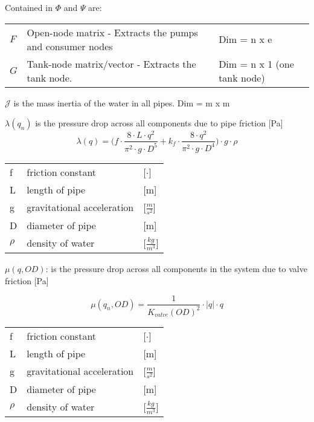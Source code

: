 Contained in $\Phi$ and $\Psi$ are:
\begin{center}
	\begin{tabular}{l p{10cm} l}
		$F$ & Open-node matrix - Extracts the pumps and consumer nodes & Dim = n x e \\
		$G$ & Tank-node matrix/vector - Extracts the tank node. & Dim = n x 1 (one tank node) 
	\end{tabular}
\end{center}

$ \mathcal{J}$ is the mass inertia of the water in all pipes. Dim =  m x m

$\lambda (q_n)$ is the pressure drop across all components due to pipe friction [\si{Pa}]
\begin{equation}
	\lambda(q)  =	\Big(f \cdot \frac{8\cdot L\cdot q^{2}}{\pi^{2}\cdot g \cdot D^{5}} + k_{f}\cdot \frac{8\cdot q^{2}}{\pi^{2}\cdot g \cdot D^{4}}\Big)\cdot g \cdot \rho
\end{equation}


\begin{center}
	\begin{tabular}{l p{10cm} l} 
		f & friction constant &	[$ \cdot $]		\\
		L & length of pipe &	[m]		\\
		g & gravitational acceleration & [$ \frac{m}{s^2} $]\\
		D & diameter of pipe & [m]			\\
		$ \rho $ & density of water & [$ \frac{kg}{m^3} $]	
	\end{tabular}
\end{center}

$\mu(q,OD)$: is the pressure drop across all components in the system due to valve friction [\si{Pa}]

\begin{equation}\label{eq:ValvePressure}
	 	 \mu(q_n,OD) = \frac{1}{K_{valve}(OD)^2} \cdot |q|\cdot q
\end{equation}

\begin{center}
	\begin{tabular}{l p{10cm} l} 
		f & friction constant &	[$ \cdot $]		\\
		L & length of pipe &	[m]		\\
		g & gravitational acceleration & [$ \frac{m}{s^2} $]\\
		D & diameter of pipe & [m]			\\
		$ \rho $ & density of water & [$ \frac{kg}{m^3} $]	
	\end{tabular}
\end{center}

